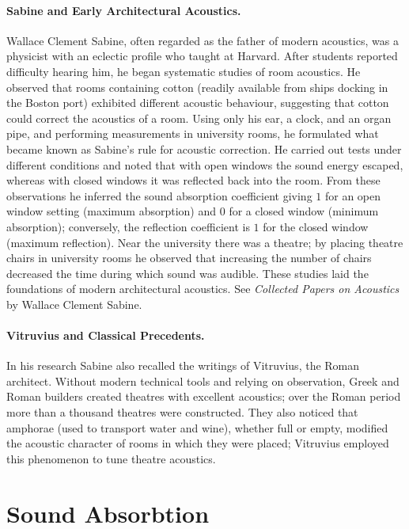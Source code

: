 \begin{tcolorbox}[colback=lightgray, colframe=gray, title=Historical backgrounds]
    \paragraph{Sabine and Early Architectural Acoustics.} Wallace Clement Sabine, often regarded as the father of modern acoustics, was a physicist with an eclectic profile who taught at Harvard. After students reported difficulty hearing him, he began systematic studies of room acoustics. He observed that rooms containing cotton (readily available from ships docking in the Boston port) exhibited different acoustic behaviour, suggesting that cotton could correct the acoustics of a room. Using only his ear, a clock, and an organ pipe, and performing measurements in university rooms, he formulated what became known as Sabine’s rule for acoustic correction. He carried out tests under different conditions and noted that with open windows the sound energy escaped, whereas with closed windows it was reflected back into the room. From these observations he inferred the sound absorption coefficient giving \(1\) for an open window setting (maximum absorption) and \(0\) for a closed window (minimum absorption); conversely, the reflection coefficient is \(1\) for the closed window (maximum reflection). Near the university there was a theatre; by placing theatre chairs in university rooms he observed that increasing the number of chairs decreased the time during which sound was audible. These studies laid the foundations of modern architectural acoustics. See \emph{Collected Papers on Acoustics} by Wallace Clement Sabine.
    
    \paragraph{Vitruvius and Classical Precedents.} In his research Sabine also recalled the writings of Vitruvius, the Roman architect. Without modern technical tools and relying on observation, Greek and Roman builders created theatres with excellent acoustics; over the Roman period more than a thousand theatres were constructed. They also noticed that amphorae (used to transport water and wine), whether full or empty, modified the acoustic character of rooms in which they were placed; Vitruvius employed this phenomenon to tune theatre acoustics.
\end{tcolorbox}

\section{Sound Absorbtion}

